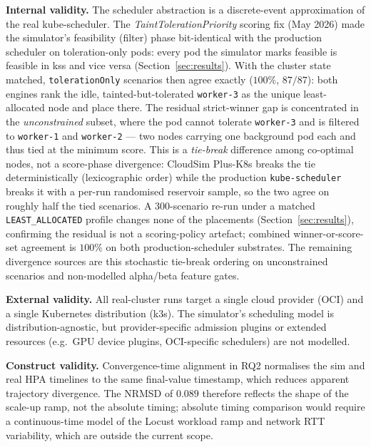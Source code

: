 \documentclass[ASNA,twocolumn]{USG}
\newcommand{\ckm}{CloudSim Plus-K8s\xspace}
\begin{document}
    \textbf{Internal validity.}
    The scheduler abstraction is a discrete-event approximation of the
    real kube-scheduler. The \emph{TaintTolerationPriority} scoring fix
    (May 2026) made the simulator's feasibility (filter) phase
    bit-identical with the production scheduler on toleration-only
    pods: every pod the simulator marks feasible is feasible in kss
    and vice versa (Section~\ref{sec:results}). With the cluster state
    matched, \texttt{tolerationOnly} scenarios then agree exactly
    ($100\%$, $87/87$): both engines rank the idle, tainted-but-tolerated
    \texttt{worker-3} as the unique least-allocated node and place there.
    The residual strict-winner gap is concentrated in the
    \emph{unconstrained} subset, where the pod cannot tolerate
    \texttt{worker-3} and is filtered to \texttt{worker-1} and
    \texttt{worker-2} --- two nodes carrying one background pod each and
    thus tied at the minimum score. This is a \emph{tie-break} difference
    among co-optimal nodes, not a score-phase divergence: \ckm breaks the
    tie deterministically (lexicographic order) while the production
    \texttt{kube-scheduler} breaks it with a per-run randomised reservoir
    sample, so the two agree on roughly half the tied scenarios. A
    $300$-scenario re-run under a matched \texttt{LEAST\_ALLOCATED} profile
    changes none of the placements (Section~\ref{sec:results}), confirming
    the residual is not a scoring-policy artefact; combined
    winner-or-score-set agreement is $100\%$ on both production-scheduler
    substrates. The remaining divergence sources are this stochastic
    tie-break ordering on unconstrained scenarios and non-modelled
    alpha/beta feature gates.

    \textbf{External validity.}
    All real-cluster runs target a single cloud provider (OCI) and a
    single Kubernetes distribution (k3s). The simulator's scheduling model
    is distribution-agnostic, but provider-specific admission plugins or
    extended resources (e.g.\ GPU device plugins, OCI-specific schedulers)
    are not modelled.

    \textbf{Construct validity.}
    Convergence-time alignment in RQ2 normalises the sim and real HPA
    timelines to the same final-value timestamp, which reduces apparent
    trajectory divergence. The NRMSD of $0.089$ therefore reflects the
    shape of the scale-up ramp, not the absolute timing; absolute timing
    comparison would require a continuous-time model of the Locust workload
    ramp and network RTT variability, which are outside the current scope.
\end{document}
